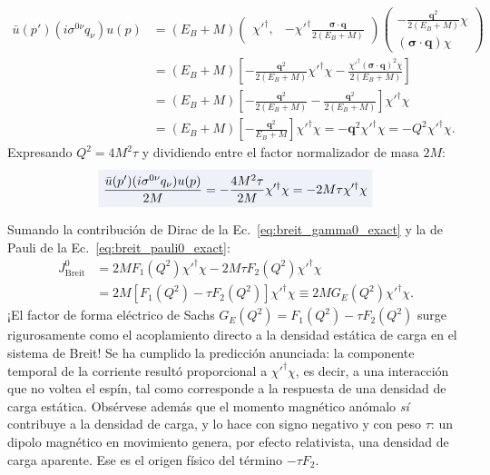 \documentclass[10pt,a4paper]{article}
\newcommand{\dest}[1]{{\setlength{\fboxsep}{4pt}\colorbox{colordest}{$\displaystyle #1$}}}
\begin{document}
\begin{align}
\bar{u}(p')(i\sigma^{0\nu} q_\nu)u(p) &= (E_B + M) \begin{pmatrix} \chi'^\dagger, & -\chi'^\dagger \frac{\boldsymbol{\sigma} \cdot \mathbf{q}}{2(E_B + M)} \end{pmatrix} \begin{pmatrix} -\frac{\mathbf{q}^2}{2(E_B + M)} \chi \\ (\boldsymbol{\sigma} \cdot \mathbf{q}) \chi \end{pmatrix} \nonumber \\
&= (E_B + M) \left[ -\frac{\mathbf{q}^2}{2(E_B + M)} \chi'^\dagger \chi - \frac{\chi'^\dagger (\boldsymbol{\sigma} \cdot \mathbf{q})^2 \chi}{2(E_B + M)} \right] \nonumber \\
&= (E_B + M) \left[ -\frac{\mathbf{q}^2}{2(E_B + M)} - \frac{\mathbf{q}^2}{2(E_B + M)} \right] \chi'^\dagger \chi \nonumber \\
&= (E_B + M) \left[ -\frac{\mathbf{q}^2}{E_B + M} \right] \chi'^\dagger \chi = -\mathbf{q}^2 \chi'^\dagger \chi = -Q^2 \chi'^\dagger \chi.
\end{align}
Expresando $Q^2 = 4 M^2 \tau$ y dividiendo entre el factor normalizador de masa $2M$:
\begin{equation}
\dest{\frac{\bar{u}(p')(i\sigma^{0\nu} q_\nu)u(p)}{2M} = -\frac{4 M^2 \tau}{2M} \chi'^\dagger \chi = -2 M \tau \chi'^\dagger \chi}
\label{eq:breit_pauli0_exact}
\end{equation}

Sumando la contribución de Dirac de la Ec.~\eqref{eq:breit_gamma0_exact} y la de Pauli de la Ec.~\eqref{eq:breit_pauli0_exact}:
\begin{align}
J^0_{\text{Breit}} &= 2 M F_1(Q^2) \chi'^\dagger \chi - 2 M \tau F_2(Q^2) \chi'^\dagger \chi \nonumber \\
&= 2 M \left[ F_1(Q^2) - \tau F_2(Q^2) \right] \chi'^\dagger \chi \equiv 2 M G_E(Q^2) \chi'^\dagger \chi.
\label{eq:J0_breit_proved}
\end{align}
¡El factor de forma eléctrico de Sachs $G_E(Q^2) = F_1(Q^2) - \tau F_2(Q^2)$ surge rigurosamente como el acoplamiento directo a la densidad estática de carga en el sistema de Breit! Se ha cumplido la predicción anunciada: la componente temporal de la corriente resultó proporcional a $\chi'^\dagger\chi$, es decir, a una interacción que no voltea el espín, tal como corresponde a la respuesta de una densidad de carga estática. Obsérvese además que el momento magnético anómalo \emph{sí} contribuye a la densidad de carga, y lo hace con signo negativo y con peso $\tau$: un dipolo magnético en movimiento genera, por efecto relativista, una densidad de carga aparente. Ese es el origen físico del término $-\tau F_2$.
\end{document}
